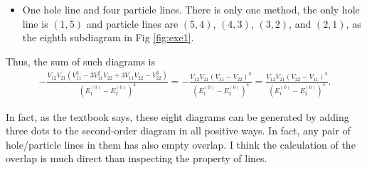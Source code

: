 \documentclass[a4paper]{book}
\newcounter{solution}[chapter]
\newcommand\Figref[1]{Fig \ref{#1}}
\begin{document}
\begin{solution}
\begin{itemize}
\begin{itemize}
		\item Hole lines are $(1,2)$, $(2,5)$ while particle lines are $(5,4)$, $(4,3)$, and $(3,1)$.
	
		\end{itemize}
		They correspond to the fifth, sixth, seventh subdiagram in \Figref{fig:exe1}.
		
	\item One hole line and four particle lines. There is only one method, the only hole line is $(1,5)$ and particle lines are $(5,4)$, $(4,3)$, $(3,2)$, and $(2,1)$, as the eighth subdiagram in \Figref{fig:exe1}.
			
	\end{itemize}
	
	Thus, the sum of such diagrams is
	\begin{align*}
		- \frac{ V_{12} V_{21} \left( V^3_{11} - 3 V^2_{11} V_{22} + 3 V_{11} V_{22} - V^3_{22} \right) }{ ( E^{(0)}_1 - E^{(0)}_2)^4 } = - \frac{ V_{12} V_{21} \left( V_{11} - V_{22} \right)^3 }{ ( E^{(0)}_1 - E^{(0)}_2)^4 } = \frac{ V_{12} V_{21} \left( V_{22} - V_{11} \right)^3 }{ ( E^{(0)}_1 - E^{(0)}_2)^4 }.
	\end{align*}
	
	In fact, as the textbook says, these eight diagrams can be generated by adding three dots to the second-order diagram in all positive ways. In fact, any pair of hole/particle lines in them has also empty overlap. I think the calculation of the overlap is much direct than inspecting the property of lines.
	
	\end{solution}
\end{document}
